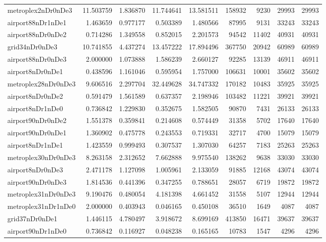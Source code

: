\begin{longtable}{|l|r|r|r|r|r|r|r|r|}
metroplex2nDr0nDe3 & 11.503759 & 1.836870 & 11.744641 & 13.581511 & 158932 & 9230 & 29993 & 29993 \\
airport88nDr1nDe1 & 1.463659 & 0.977177 & 0.503389 & 1.480566 & 87995 & 9131 & 33243 & 33243 \\
airport88nDr0nDe2 & 0.714286 & 1.349558 & 0.852015 & 2.201573 & 94542 & 11402 & 40931 & 40931 \\
grid34nDr0nDe3 & 10.741855 & 4.437274 & 13.457222 & 17.894496 & 367750 & 20942 & 60989 & 60989 \\
airport88nDr0nDe3 & 2.000000 & 1.073888 & 1.586239 & 2.660127 & 92285 & 13139 & 46911 & 46911 \\
airport8nDr0nDe1 & 0.438596 & 1.161046 & 0.595954 & 1.757000 & 106631 & 10001 & 35602 & 35602 \\
metroplex28nDr0nDe3 & 9.606516 & 2.297704 & 32.449628 & 34.747332 & 170182 & 10483 & 35925 & 35925 \\
airport8nDr0nDe2 & 0.591479 & 1.561589 & 0.637357 & 2.198946 & 103482 & 11221 & 39921 & 39921 \\
airport8nDr1nDe0 & 0.736842 & 1.229830 & 0.352675 & 1.582505 & 90870 & 7431 & 26133 & 26133 \\
airport90nDr0nDe2 & 1.551378 & 0.359841 & 0.214608 & 0.574449 & 31358 & 5702 & 17640 & 17640 \\
airport90nDr0nDe1 & 1.360902 & 0.475778 & 0.243553 & 0.719331 & 32717 & 4700 & 15079 & 15079 \\
airport8nDr1nDe1 & 1.423559 & 0.999493 & 0.307537 & 1.307030 & 64257 & 7183 & 25263 & 25263 \\
metroplex30nDr0nDe3 & 8.263158 & 2.312652 & 7.662888 & 9.975540 & 138262 & 9638 & 33030 & 33030 \\
airport8nDr0nDe3 & 2.471178 & 1.127098 & 1.005961 & 2.133059 & 91885 & 12168 & 43074 & 43074 \\
airport90nDr0nDe3 & 1.814536 & 0.441396 & 0.347255 & 0.788651 & 28057 & 6719 & 19872 & 19872 \\
metroplex31nDr0nDe3 & 9.190476 & 0.480054 & 4.181398 & 4.661452 & 31558 & 5107 & 12944 & 12944 \\
metroplex31nDr1nDe0 & 2.000000 & 0.403943 & 0.046165 & 0.450108 & 36510 & 1649 & 4087 & 4087 \\
grid37nDr0nDe1 & 1.446115 & 4.780497 & 3.918672 & 8.699169 & 413850 & 16471 & 39637 & 39637 \\
airport90nDr1nDe0 & 0.736842 & 0.116927 & 0.048238 & 0.165165 & 10783 & 1547 & 4296 & 4296 \\

\end{longtable}
